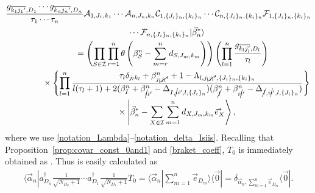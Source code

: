 \documentclass[pdftex]{sigma}
\numberwithin{equation}{section}
\begin{document}
\begin{gather}
 \frac{
 g_{\overline{k_{1}{j_{1}}'},D_{1}}
 \cdots
 g_{\overline{k_{n}{j_{n}}'},D_{n}}
 }{
 \tau_{1}
 \cdots
 \tau_{n}
 }
 \mathcal{A}_{
 1,
 J_{1},
 k_{1}
 }
 \cdots
 \mathcal{A}_{
 n,
 J_{n},
 k_{n}
 }
 \mathcal{C}_{
 1,
 \{
 J_{i}
 \}_{n}
 ,
 \{
 k_{i}
 \}_{n}
 }
 \cdots
 \mathcal{C}_{
 n,
 \{
 J_{i}
 \}_{n}
 ,
 \{
 k_{i}
 \}_{n}
 }
 \mathcal{F}_{
 1,
 \{
 J_{i}
 \}_{n}
 ,
 \{
 k_{i}
 \}_{n}
 }\nonumber\\
 \qquad
 \cdots
 \mathcal{F}_{
 n,
 \{
 J_{i}
 \}_{n}
 ,
 \{
 k_{i}
 \}_{n}
 }
 |
 \vec{\beta}_{n}^{\ast}
 \rangle
 \nonumber
 \\
 \qquad\phantom{\cdots}{}=
 \left(
 \prod_{
 S
 \in
 \mathcal{I}
 }
 \prod_{r=1}^{n}
 \theta
 \left(
 \beta_{S}^{n}
 -
 \sum_{m=r}^{n}
 d_{
 S,
 J_{m},
 k_{m}
 }
 \right)
 \right)
 \left(
 \prod_{l=1}^{n}
 \frac{g_{\overline{k_{l}j_{l}'},D_{l}}}{\tau_{l}}
 \right)\nonumber
 \\
 \qquad\phantom{\cdots=}{}
 \times
 \left\{
 \prod_{l=1}^{n}
 \frac{
 \tau_{l}
 \delta_{j_{l}k_{l}}
 +
 \beta_{j_{l}\cancel{j_{l}}'}^{n}
 +
 1
 -
 \Lambda_{
 l,
 j_{l}\cancel{j_{l}}',
 \{
 J_{i}
 \}_{n}
 ,
 \{
 k_{i}
 \}_{n}
 }
 }{
 l
 (
 \tau_{l}+1
 )
 +
 2
 (
 \beta_{I}^{n}
 +
 \beta_{\cancel{i}i'}^{n}
 -
 \Delta_{
 I,
 \cancel{i}i',
 l,
 \{
 J_{i}
 \}_{n}
 }
 )
 (
 \beta_{\cancel{I}}^{n}
 +
 \beta_{i\cancel{i}'}^{n}
 -
 \Delta_{
 \cancel{I},
 i\cancel{i}',
 l,
 \{
 J_{i}
 \}_{n}
 }
 )
 }
 \right\}\nonumber\\
 \qquad\phantom{\cdots=}{}\times
 \left|
 \vec{\beta}_{n}^{\ast}
 -
 \sum_{
 X
 \in
 \mathcal{I}
 }
 \sum_{m=1}^{n}
 d_{
 X,
 J_{m},
 k_{m}
 }
 \vec{e}_{X}^{\ast}
 \right\rangle
 ,
 \label{act_ACF}
\end{gather}
where we use \eqref{notation_Lambda}--\eqref{notation_delta_Isiis}.
Recalling that Proposition~\ref{prop:covar_const_0and1} and \eqref{braket_coeff}, $T_{0}$ is immediately obtained as
.
Thus
is easily calculated as
\begin{align}
\langle
 \vec{\alpha}_{n}
|
 a_{D_{n}}^{\dagger}
 \frac{1}{
 \sqrt{
 N_{D_{n}}
 +
 1
 }
 }
 \cdots
 a_{D_{1}}^{\dagger}
 \frac{1}{
 \sqrt{
 N_{D_{1}}
 +
 1
 }
 }
 T_{0}
 =
\Big\langle
 \vec{\alpha}_{n}
|
 \sum_{m=1}^{n}
 \vec{e}_{D_{m}}
 \Big\rangle
 \langle
 \vec{0}
 |
 =
 \delta_{
 \vec{\alpha}_{n},
 \sum_{m=1}^{n}
 \vec{e}_{D_{m}}
 }
 \langle
 \vec{0}
 | .
 \label{act_a_opr}
\end{align}
\end{document}
